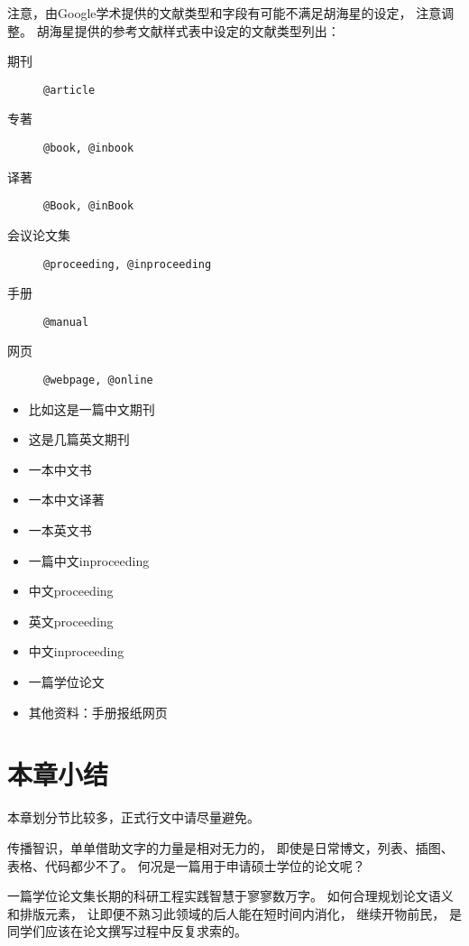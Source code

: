 注意，由Google学术提供的文献类型和字段有可能不满足胡海星的设定，
注意调整。
胡海星提供的参考文献样式表中设定的文献类型列出：
\begin{description}
    \item[期刊]          \texttt{@article}
    \item[专著]          \texttt{@book, @inbook}
    \item[译著]          \texttt{@Book, @inBook}
    \item[会议论文集]    \texttt{@proceeding, @inproceeding}
    \item[手册]          \texttt{@manual}
    \item[网页]          \texttt{@webpage, @online}
\end{description}

\begin{itemize}
    \item 比如这是一篇中文期刊\cite{lixiaodong1999}
    \item 这是几篇英文期刊\cite{christine1998, kanamori1998}
    \item 一本中文书\cite{zh-book-1}
    \item 一本中文译著\cite{anwen1988b}
    \item 一本英文书\cite{lamport1994latex, takeuti1973}
    \item 一篇中文inproceeding\cite{nonlinear1996}
    \item 中文proceeding\cite{a2-1}
    \item 英文proceeding\cite{a2-2}
    \item 中文inproceeding\cite{aczel1998}
    \item 一篇学位论文\cite{a4-1} 
    \item 其他资料：手册\cite{ipad}报纸\cite{renminribao}网页\cite{dubash2010}
\end{itemize}

\section{本章小结}

本章划分节比较多，正式行文中请尽量避免。

传播智识，单单借助文字的力量是相对无力的，
即使是日常博文，列表、插图、表格、代码都少不了。
何况是一篇用于申请硕士学位的论文呢？

一篇学位论文集长期的科研工程实践智慧于寥寥数万字。
如何合理规划论文语义和排版元素，
让即便不熟习此领域的后人能在短时间内消化，
继续开物前民，
是同学们应该在论文撰写过程中反复求索的。


